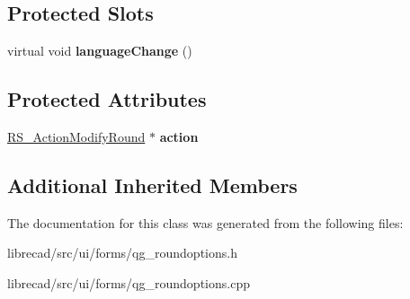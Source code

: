 \subsection*{Protected Slots}
\begin{DoxyCompactItemize}
\item 
\hypertarget{classQG__RoundOptions_a8f719da71ece703448afd9c1d8b64412}{virtual void {\bfseries language\-Change} ()}\label{classQG__RoundOptions_a8f719da71ece703448afd9c1d8b64412}

\end{DoxyCompactItemize}
\subsection*{Protected Attributes}
\begin{DoxyCompactItemize}
\item 
\hypertarget{classQG__RoundOptions_a8ed5ad6f3117997e1d4efb999e02cd22}{\hyperlink{classRS__ActionModifyRound}{R\-S\-\_\-\-Action\-Modify\-Round} $\ast$ {\bfseries action}}\label{classQG__RoundOptions_a8ed5ad6f3117997e1d4efb999e02cd22}

\end{DoxyCompactItemize}
\subsection*{Additional Inherited Members}


The documentation for this class was generated from the following files\-:\begin{DoxyCompactItemize}
\item 
librecad/src/ui/forms/qg\-\_\-roundoptions.\-h\item 
librecad/src/ui/forms/qg\-\_\-roundoptions.\-cpp\end{DoxyCompactItemize}
